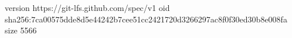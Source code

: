 version https://git-lfs.github.com/spec/v1
oid sha256:7ca00575dde8d5e44242b7cee51cc2421720d3266297ac8f0f30ed30b8e008fa
size 5566
